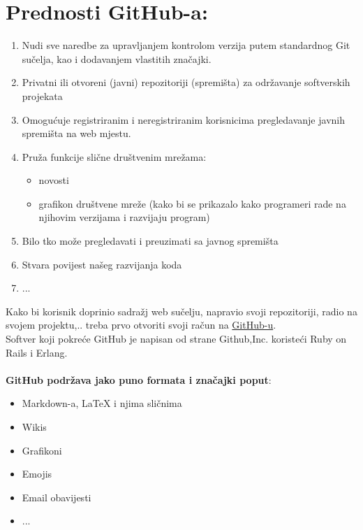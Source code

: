 \documentclass{article}
\begin{document}
	\section{\textbf {Prednosti GitHub-a}:}
		\begin{enumerate}
			\item Nudi sve naredbe za upravljanjem kontrolom verzija putem standardnog Git sučelja, kao i dodavanjem vlastitih značajki.
			\item Privatni ili otvoreni (javni) repozitoriji (spremišta) za održavanje softverskih projekata
			\item Omogućuje registriranim i neregistriranim korisnicima pregledavanje javnih spremišta na web mjestu.	
			\newpage
			\item Pruža funkcije slične društvenim mrežama:
			\begin{itemize}
				\item novosti
				\item grafikon društvene mreže (kako bi se prikazalo kako programeri rade na njihovim verzijama i razvijaju program)

			\end{itemize}
			\item Bilo tko može pregledavati i preuzimati sa javnog spremišta
			\item Stvara povijest našeg razvijanja koda
			\item ...
		\end{enumerate}
		Kako bi korisnik doprinio sadražj web sučelju, napravio svoji repozitoriji, radio na svojem projektu,.. treba
		prvo otvoriti svoji račun na \href{https://github.com/github}{GitHub-u}.\\
		Softver koji pokreće GitHub je napisan od strane Github,Inc. koristeći Ruby on Rails i Erlang.
		\\
		\\
		\textbf{GitHub podržava jako puno formata i značajki poput}:
		\begin{itemize}
			\item Markdown-a, LaTeX i njima sličnima
			\item Wikis
			\item Grafikoni
			\item Emojis
			\item Email obavijesti
			\item ...\\
		\end{itemize}
\end{document}

